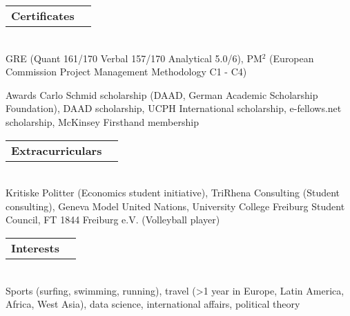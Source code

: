 \documentclass[A4,11pt]{article}
\makeatletter
\newcommand{\Subheading}[5]{   
    \begin{tabular*}{0.97\textwidth}[t]{l@{\extracolsep{\fill}}r}
      \textbf{#1}\textit{\small #2} & \small #3 
      \end{tabular*} \\
      \small #4 \\
    \vspace{7pt}
    }
\makeatother
\begin{document}
    \Subheading
    {Certificates}{}{}
    {GRE (Quant 161/170 Verbal 157/170 Analytical 5.0/6),  
    PM$^2$ (European Commission Project Management Methodology C1 - C4)}
    
    \Subheading
    {Awards}{}{}
    {Carlo Schmid scholarship (DAAD, German Academic Scholarship Foundation), 
    DAAD scholarship, 
    UCPH International scholarship, 
    e-fellows.net scholarship, 
    McKinsey Firsthand membership} 

    \Subheading
    {Extracurriculars}{}{}
    {Kritiske Politter (Economics student initiative), TriRhena Consulting (Student consulting), Geneva Model United Nations, University College Freiburg Student Council, FT 1844 Freiburg e.V. (Volleyball player)}{}

    \Subheading
    {Interests}{}{}
    {Sports (surfing, swimming, running), travel (>1 year in Europe, Latin America, Africa, West Asia), data science, international affairs, political theory}

\vfill
{}
\end{document}
